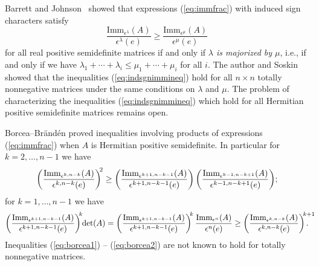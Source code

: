 \documentclass[12pt]{amsart}
\numberwithin{equation}{section}
\newcommand{\imm}[1]{\mathrm{Imm}_{#1}}
\newcommand{\ntnsp}{\negthinspace}
\newcommand{\ntksp}{\negthickspace}
\newcommand{\nTksp}{\negthickspace\negthickspace}
\begin{document}
Barrett and Johnson~\cite{BJMajor} showed that
expressions (\ref{eq:immfrac})
with induced sign characters
satisfy
\begin{equation}\label{eq:indsgnimmineq}
  \frac{\imm{\epsilon^\lambda}(A)}{\epsilon^\lambda(e)}
  \geq
  \frac{\imm{\epsilon^\mu}(A)}{\epsilon^\mu(e)}
\end{equation}
for all real positive semidefinite matrices
if and only if {\em $\lambda$ is majorized by $\mu$},
i.e., if and only if we have
$\lambda_1 + \cdots + \lambda_i \leq \mu_1 + \cdots + \mu_i$ for all $i$.
The author and Soskin~\cite{SkanSoskinBJ}
showed that the inequalities (\ref{eq:indsgnimmineq})
hold for all $n \times n$ totally nonnegative matrices
under the same conditions on $\lambda$ and $\mu$.
The problem of characterizing the inequalities (\ref{eq:indsgnimmineq})
which hold for all Hermitian positive semidefinite matrices remains
open.

Borcea--Br\"and\'en proved inequalities involving products of expressions
(\ref{eq:immfrac}) when $A$ is Hermitian positive semidefinite.
In particular for
$k = 2,\dotsc, n-1$ we have~\cite[Cor.\,3.1(b)]{BBApps}
  \begin{equation}\label{eq:borcea1}
    \left(\frac{\imm{\epsilon^{k,n-k}}(A)}{\epsilon^{k,n-k}(e)}\right)^{\ntksp2}
    \geq
    \left(\frac{\imm{\epsilon^{k+1,n-k-1}}(A)}{\epsilon^{k+1,n-k-1}(e)}\right)
    \left(\frac{\imm{\epsilon^{k-1,n-k+1}}(A)}{\epsilon^{k-1,n-k+1}(e)}\right)\ntnsp;
  \end{equation}
  for
  $k = 1,\dotsc, n-1$ we have~\cite[Cor.\,3.1(c)]{BBApps}
  \begin{equation}\label{eq:borcea2}
    \left(\frac{\imm{\epsilon^{k+1,n-k-1}}(A)}{\epsilon^{k+1,n-k-1}(e)}\right)^{\ntksp k}
    \ntksp \det(A)
    =
    \left(\frac{\imm{\epsilon^{k+1,n-k-1}}(A)}{\epsilon^{k+1,n-k-1}(e)}\right)^{\ntksp k}
    \frac{\imm{\epsilon^n}(A)}{\epsilon^n(e)}
    \geq
    \left(\frac{\imm{\epsilon^{k,n-k}}(A)}{\epsilon^{k,n-k}(e)}\right)^{\ntksp k+1}\nTksp\nTksp\ntnsp.
  \end{equation}
  Inequalities (\ref{eq:borcea1}) -- (\ref{eq:borcea2})
  are not known to hold for totally nonnegative matrices.
\end{document}
